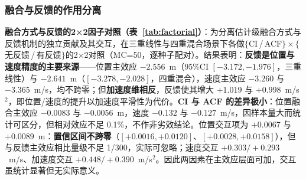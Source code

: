 \documentclass[UTF8,a4paper,zihao=-4]{ctexart}
\begin{document}
\subsubsection{融合与反馈的作用分离}\label{sec:fusion-ablation}
\textbf{融合方式与反馈的2×2因子对照（表~\ref{tab:factorial}）}：为分离估计级融合方式与反馈机制的独立贡献及其交互，在三重线性与四重混合场景下各做$\{$CI\,/\,ACF$\}\times\{$无反馈\,/\,有反馈$\}$的2×2对照（MC=50，逐种子配对）。结果表明：\textbf{反馈是位置与速度精度的主要来源}——位置主效应 $-2.556$~m（95\%CI $[-3.172,-1.976]$，三重线性）与 $-2.641$~m（$[-3.278,-2.028]$，四重混合），速度主效应 $-3.260$ 与 $-3.365$~m/s，均不跨零；但\textbf{加速度维相反}，反馈使其增大 $+1.019$ 与 $+0.998$~m/s$^2$，即位置/速度的提升以加速度平滑性为代价。\textbf{CI 与 ACF 的差异极小}：位置融合主效应 $-0.0083$ 与 $-0.0056$~m，速度 $-0.132$ 与 $-0.127$~m/s，因样本量大而统计可区分，但相对效应不足 0.1\%，不作非劣效结论。位置交互项为 $+0.0067$ 与 $+0.0089$~m：\textbf{置信区间不跨零}（$[+0.0016,+0.0120]$、$[+0.0028,+0.0158]$），但与反馈主效应相比量级不足 1/300，实际可忽略；速度交互 $+0.303/+0.293$~m/s、加速度交互 $+0.448/+0.390$~m/s$^2$。因此两因素在主效应层面可加，交互虽统计显著但无实际意义。

\begin{table}[htbp]
\centering
\caption{融合方式与估计级反馈的2×2因子对照（单元位置RMSE 均值，单位：m；主效应与交互项为配对差，bootstrap 10000，MC=50）}
\label{tab:factorial}
\end{table}
\end{document}
